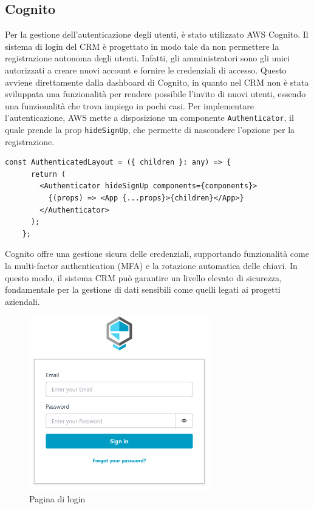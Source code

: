 \documentclass[target=bach,aauheader=,style=]{thud}
\begin{document}
\subsection{Cognito}
Per la gestione dell'autenticazione degli utenti, è stato utilizzato AWS Cognito. Il sistema di login del CRM è progettato in modo tale da non permettere la registrazione autonoma degli utenti. Infatti, gli amministratori sono gli unici autorizzati a creare nuovi account e fornire le credenziali di accesso. Questo avviene direttamente dalla dashboard di Cognito, in quanto nel CRM non è stata sviluppata una funzionalità per rendere possibile l'invito di nuovi utenti, essendo una funzionalità che trova impiego in pochi casi. Per implementare l'autenticazione, AWS mette a disposizione un componente \texttt{Authenticator}, il quale prende la prop \texttt{hideSignUp}, che permette di nascondere l'opzione per la registrazione.


\begin{lstlisting}[caption=Parte del file \texttt{AuthenticatedLayout.tsx} del CRM]
    const AuthenticatedLayout = ({ children }: any) => {
      return (
        <Authenticator hideSignUp components={components}>
          {(props) => <App {...props}>{children}</App>}
        </Authenticator>
      );
    };
\end{lstlisting}

\noindent Cognito offre una gestione sicura delle credenziali, supportando funzionalità come la multi-factor authentication (MFA) e la rotazione automatica delle chiavi. In questo modo, il sistema CRM può garantire un livello elevato di sicurezza, fondamentale per la gestione di dati sensibili come quelli legati ai progetti aziendali.

\begin{figure}[H]
    \centering
    \includegraphics[width=0.7\textwidth]{img/login.pdf} 
    \caption{Pagina di login}
\end{figure}
\end{document}
